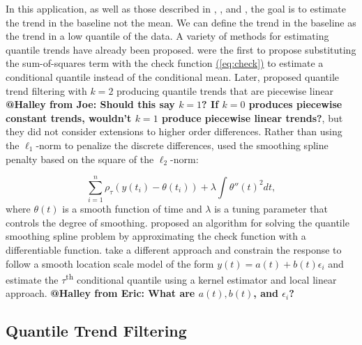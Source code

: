 \documentclass[12pt]{article}
\makeatletter
\newcommand{\Halley}[2]{{\bf {\color{purple}@Halley from #1: #2}}\xspace}
\newcommand{\Eqn}[1]{\hyperref[eq:#1]{{\rm (\ref*{eq:#1})}}} %
\newcommand{\Eqn}[1]{{(\ref{eq:#1})}} %
\makeatother
\begin{document}
	In this application, as well as those described in \cite{Ning2014}, \cite{marandi2015qualitative}, and \cite{pettersson2013algorithm}, the goal is to estimate the trend in the baseline not the mean. We can define the trend in the baseline as the trend in a low quantile of the data. A variety of methods for estimating quantile trends have already been proposed. \cite{Koenker1978} were the first to propose substituting the sum-of-squares term with the check function  \Eqn{check} to estimate a conditional quantile instead of the conditional mean. Later, \cite{KoenkerNgPortnoy1994} proposed quantile trend filtering with $k = 2$ producing quantile trends that are piecewise linear \Halley{Joe}{Should this say $k=1$? If $k=0$ produces piecewise constant trends, wouldn't $k=1$ produce piecewise linear trends?}, but they did not consider extensions to higher order differences. Rather than using the $\ell_1$-norm to penalize the discrete differences, \cite{nychka1995nonparametric} used the smoothing spline penalty based on the square of the $\ell_2$-norm:

	\begin{equation*}
	\label{eq:smoothingspline}
	\sum_{i=1}^n\rho_{\tau}(y(t_i) - \theta(t_i)) + \lambda\int \theta''(t)^2 dt,
 	\end{equation*}
	where $\theta(t)$ is a smooth function of time and $\lambda$ is a tuning parameter that controls the degree of smoothing. \cite{Oh2011} proposed an algorithm for solving the quantile smoothing spline problem by approximating the check function with a differentiable function. \cite{Racine2017} take a different approach and constrain the response to follow a smooth location scale model of the form $y(t) = a(t) + b(t)\epsilon_i$ and estimate the $\tau$\textsuperscript{th} conditional quantile using a kernel estimator and local linear approach. \Halley{Eric}{What are $a(t), b(t)$, and $\epsilon_i$?}


\subsection{Quantile Trend Filtering}
\end{document}
